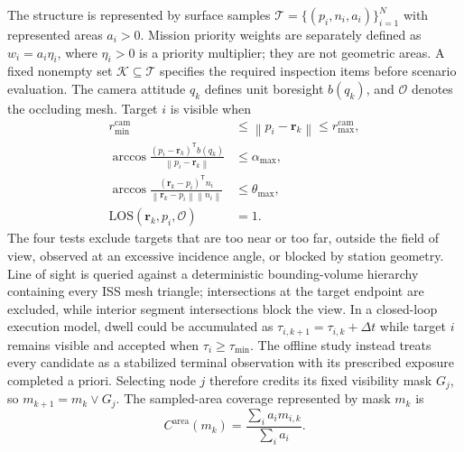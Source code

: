 \documentclass{IEEEtaes}
\newcommand{\dt}{\Delta t}
\newcommand{\norm}[1]{\left\lVert #1 \right\rVert}
\newcommand{\los}{\mathrm{LOS}}
\theoremstyle{remark}
\theoremstyle{plain}
\begin{document}
The structure is represented by surface samples $\mathcal T=\{(p_i,n_i,a_i)\}_{i=1}^{N}$ with represented areas $a_i>0$. Mission priority weights are separately defined as $w_i=a_i\eta_i$, where $\eta_i>0$ is a priority multiplier; they are not geometric areas. A fixed nonempty set $\mathcal K\subseteq\mathcal T$ specifies the required inspection items before scenario evaluation. The camera attitude $q_k$ defines unit boresight $b(q_k)$, and $\mathcal O$ denotes the occluding mesh. Target $i$ is visible when
\begin{align}
  r_{\min}^{\mathrm{cam}}&\le\norm{p_i-\mathbf r_k}\le r_{\max}^{\mathrm{cam}},\nonumber\\
  \arccos\!\frac{(p_i-\mathbf r_k)^{\mathsf T}b(q_k)}
  {\norm{p_i-\mathbf r_k}}&\le\alpha_{\max},\nonumber\\
  \arccos\!\frac{(\mathbf r_k-p_i)^{\mathsf T}n_i}
  {\norm{\mathbf r_k-p_i}\norm{n_i}}&\le\theta_{\max},\nonumber\\
  \los(\mathbf r_k,p_i,\mathcal O)&=1.
  \label{eq:visibility}
\end{align}
The four tests exclude targets that are too near or too far, outside the field of view, observed at an excessive incidence angle, or blocked by station geometry. Line of sight is queried against a deterministic bounding-volume hierarchy containing every ISS mesh triangle; intersections at the target endpoint are excluded, while interior segment intersections block the view. In a closed-loop execution model, dwell could be accumulated as $\tau_{i,k+1}=\tau_{i,k}+\dt$ while target $i$ remains visible and accepted when $\tau_i\ge\tau_{\min}$. The offline study instead treats every candidate as a stabilized terminal observation with its prescribed exposure completed a priori. Selecting node $j$ therefore credits its fixed visibility mask $G_j$, so $m_{k+1}=m_k\lor G_j$. The sampled-area coverage represented by mask $m_k$ is
\begin{equation}
  C^{\mathrm{area}}(m_k)=\frac{\sum_i a_i m_{i,k}}{\sum_i a_i}.
  \label{eq:coverage}
\end{equation}
\end{document}
